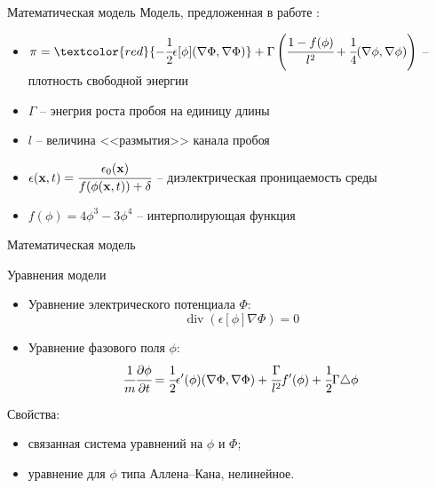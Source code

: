 \documentclass{beamer}
\DeclareMathOperator{\Div}{div}
\begin{document}
\begin{frame}{Математическая модель}
Модель, предложенная в работе \cite{kiam_model}:
\begin{itemize}
	\item $\pi = \textcolor{red}{-\cfrac{1}{2} \epsilon[\phi] (\nabla \Phi, \nabla \Phi)} +
	\Gamma \left( \cfrac{1 - f(\phi)}{l^2} + \cfrac{1}{4} (\nabla \phi, \nabla \phi) \right)$
	-- плотность свободной энергии
	\item $\Gamma$ -- энегрия роста пробоя на единицу длины
	\item $l$ -- величина <<размытия>> канала пробоя
	\item $\epsilon(\textbf{x}, t) = \cfrac{\epsilon_0(\textbf{x})}{f(\phi(\textbf{x}, t)) +
	\delta}$ -- диэлектрическая проницаемость среды
	\item $f(\phi) = 4 \phi^3 - 3 \phi^4$ -- интерполирующая функция
\end{itemize}
\end{frame}


\begin{frame}{Математическая модель}
\vspace{-0.5cm}
\begin{block}{Уравнения модели}
\begin{itemize}
	\item Уравнение электрического потенциала $\Phi$:
	\begin{equation}
		\Div(\epsilon[\phi] \nabla \Phi) = 0
		\label{equation_potential}
	\end{equation}
	\item Уравнение фазового поля $\phi$:
	\begin{equation}
		\cfrac{1}{m} \cfrac{\partial \phi}{\partial t} = \cfrac{1}{2} \epsilon'(\phi)
		(\nabla \Phi, \nabla \Phi) + \cfrac{\Gamma}{l^2} f'(\phi) +
		\cfrac{1}{2} \Gamma \triangle \phi
		\label{equation_phase}
	\end{equation}
\end{itemize}
\end{block}
Свойства:
\begin{itemize}
	\item связанная система уравнений на $\phi$ и $\Phi$;
	\item уравнение для $\phi$ типа Аллена--Кана, нелинейное.
\end{itemize}
\end{frame}
\end{document}
